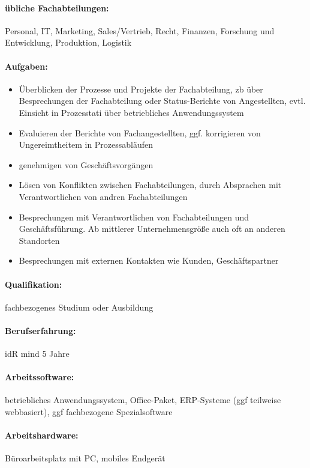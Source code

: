 \documentclass[11pt,oneside,a4paper,notitlepage]{article}
\begin{document}
\paragraph*{übliche Fachabteilungen: } Personal, IT, Marketing, Sales/Vertrieb, Recht, Finanzen, Forschung und Entwicklung, Produktion, Logistik

\paragraph*{Aufgaben: }
\begin{itemize}
\item Überblicken der Prozesse und Projekte der Fachabteilung, zb über Besprechungen der Fachabteilung oder Status-Berichte von Angestellten, evtl. Einsicht in Prozesstati über betriebliches Anwendungssystem
\item Evaluieren der Berichte von Fachangestellten, ggf. korrigieren von Ungereimtheitem in Prozessabläufen
\item genehmigen von Geschäftsvorgängen
\item Lösen von Konflikten zwischen Fachabteilungen, durch Absprachen mit Verantwortlichen von andren Fachabteilungen
\item Besprechungen mit Verantwortlichen von Fachabteilungen und Geschäftsführung. Ab mittlerer Unternehmensgröße auch oft an anderen Standorten
\item Besprechungen mit externen Kontakten wie Kunden, Geschäftspartner
\end{itemize}
\noindent

\paragraph*{Qualifikation: } fachbezogenes Studium oder Ausbildung

%
\paragraph*{Berufserfahrung: } idR mind 5 Jahre

%
\paragraph*{Arbeitssoftware: } betriebliches Anwendungssystem, Office-Paket, ERP-Systeme (ggf teilweise webbasiert), ggf fachbezogene Spezialsoftware

%
\paragraph*{Arbeitshardware: } Büroarbeitsplatz mit PC, mobiles Endgerät


%
\end{document}
